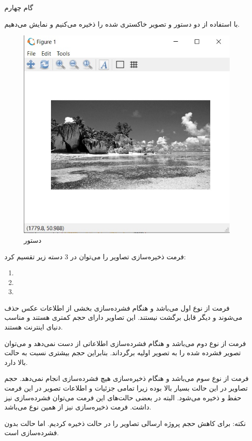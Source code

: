 \Problem
{گام چهارم}
{
    با استفاده از دو دستور 
     و  
    تصویر خاکستری شده را ذخیره می‌کنیم و نمایش می‌دهیم.
    
    \begin{figure}[H]
        \includegraphics[width=13cm]{Images/imshow.jpg}
        \centering
        \caption{دستور }
    \end{figure}
    
    فرمت ذخیره‌سازی تصاویر را می‌توان در 3 دسته زیر تقسیم کرد:
    \begin{enumerate}
        \LTR
        \item {}
        \item {}
        \item {}
    \end{enumerate}
    
    \RTL
    
    فرمت 
    از نوع اول می‌باشد و هنگام فشرده‌سازی بخشی از اطلاعات عکس حذف می‌شوند و دیگر قابل برگشت نیستند. این تصاویر دارای حجم کمتری هستند و مناسب دنیای اینترنت هستند.
    
    فرمت 
    از نوع دوم می‌باشد و هنگام فشرده‌سازی اطلاعاتی از دست نمی‌دهد و می‌توان تصویر فشرده شده را به تصویر اولیه برگرداند. بنابراین حجم بیشتری نسبت به حالت بالا دارد.
    
    فرمت 
    از نوع سوم می‌باشد و هنگام ذخیره‌سازی هیچ فشرده‌سازی انجام نمی‌دهد. حجم تصاویر در این حالت بسیار بالا بوده زیرا تمامی جزئیات و اطلاعات تصویر در این فرمت حفظ و ذخیره می‌شود. البته در بعضی حالت‌های این فرمت می‌توان فشرده‌سازی نیز داشت. فرمت ذخیره‌سازی 
    نیز از همین نوع می‌باشد.
    
    نکته: برای کاهش حجم پروژه ارسالی تصاویر را در حالت  ذخیره کردیم. اما حالت بدون فشرده‌سازی  است.
    
}
